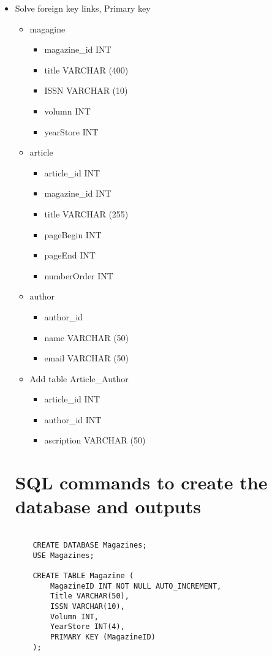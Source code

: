\documentclass[13pt,a4paper]{report}
\begin{document}
\begin{itemize}
\item Solve foreign key links, Primary key
	\begin{itemize}
	\item magagine
		\begin{itemize}
		\item magazine_id INT
		\item title VARCHAR (400)
		\item ISSN VARCHAR (10)
		\item volumn INT
		\item yearStore INT
		\end{itemize}
	\item article
		\begin{itemize}
		\item article_id INT
		\item magazine_id INT
		\item title VARCHAR (255)
		\item pageBegin INT 
		\item pageEnd INT 
		\item numberOrder INT
		\end{itemize}
	\item author
		\begin{itemize}
		\item author_id
		\item name VARCHAR (50)
		\item email VARCHAR (50)
		\end{itemize}
	\item Add table Article_Author
		\begin{itemize}
		\item article_id INT
		\item author_id INT
		\item ascription VARCHAR (50)
		\end{itemize}
	\end{itemize}

\section{ SQL commands to create the database and outputs}
\begin{lstlisting}
		
	CREATE DATABASE Magazines;
	USE Magazines;	

	CREATE TABLE Magazine ( 
		MagazineID INT NOT NULL AUTO_INCREMENT, 
		Title VARCHAR(50), 
		ISSN VARCHAR(10), 
		Volumn INT, 
		YearStore INT(4), 
		PRIMARY KEY (MagazineID)
	);


\end{lstlisting}
\end{itemize}
\end{document}
